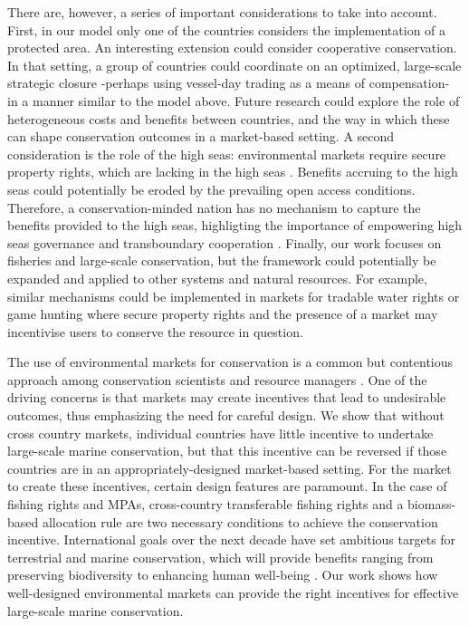 \documentclass[12pt]{article}
\begin{document}
There are, however, a series of important considerations to take into account. First, in our model only one of the countries considers the implementation of a protected area. An interesting extension could consider cooperative conservation. In that setting, a group of countries could coordinate on an optimized, large-scale strategic closure -perhaps using vessel-day trading as a means of compensation- in a manner similar to the model above. Future research could explore the role of heterogeneous costs and benefits between countries, and the way in which these can shape conservation outcomes in a market-based setting. A second consideration is the role of the high seas: environmental markets require secure property rights, which are lacking in the high seas \cite{crespo_2019}. Benefits accruing to the high seas could potentially be eroded by the prevailing open access conditions. Therefore, a conservation-minded nation has no mechanism to capture the benefits provided to the high seas, highligting the importance of empowering high seas governance and transboundary cooperation \cite{aqorau_2018,crespo_2019}. Finally, our work focuses on fisheries and large-scale conservation, but the framework could potentially be expanded and applied to other systems and natural resources. For example, similar mechanisms could be implemented in markets for tradable water rights \cite{rosegrant_1994} or game hunting \cite{hutton_2003} where secure property rights and the presence of a market may incentivise users to conserve the resource in question.

The use of environmental markets for conservation is a common but contentious approach among conservation scientists and resource managers \cite{sandbrook_2019}. One of the driving concerns is that markets may create incentives that lead to undesirable outcomes, thus emphasizing the need for careful design. We show that without cross country markets, individual countries have little incentive to undertake large-scale marine conservation, but that this incentive can be reversed if those countries are in an appropriately-designed market-based setting. For the market to create these incentives, certain design features are paramount. In the case of fishing rights and MPAs, cross-country transferable fishing rights and a biomass-based allocation rule are two necessary conditions to achieve the conservation incentive. International goals over the next decade have set ambitious targets for terrestrial and marine conservation, which will provide benefits ranging from preserving biodiversity to enhancing human well-being \cite{oleary_2016,dinerstein_2019,roberts_2017,ban_2019}. Our work shows how well-designed environmental markets can provide the right incentives for effective large-scale marine conservation.
\end{document}
